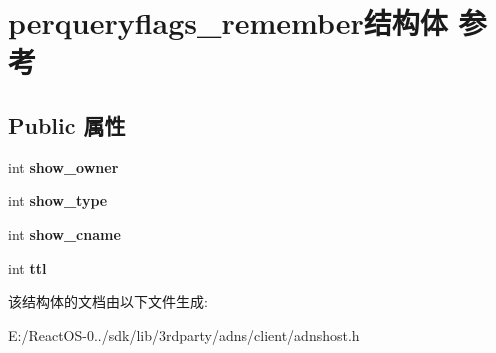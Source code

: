 \hypertarget{structperqueryflags__remember}{}\section{perqueryflags\+\_\+remember结构体 参考}
\label{structperqueryflags__remember}
\subsection*{Public 属性}
\begin{DoxyCompactItemize}
\item 
\mbox{\label{structperqueryflags__remember_aad76288c5ecd2806cd427838d8918b9a}} 
int {\bfseries show\+\_\+owner}
\item 
\mbox{\label{structperqueryflags__remember_a7e9c07044711bc79404fa77d251f2466}} 
int {\bfseries show\+\_\+type}
\item 
\mbox{\label{structperqueryflags__remember_a438635618eac98d7fe1fe7b052ea7afc}} 
int {\bfseries show\+\_\+cname}
\item 
\mbox{\label{structperqueryflags__remember_a433695a3dd6fd9e4d3029e66088086c0}} 
int {\bfseries ttl}
\end{DoxyCompactItemize}


该结构体的文档由以下文件生成\+:\begin{DoxyCompactItemize}
\item 
E\+:/\+React\+O\+S-\/0../sdk/lib/3rdparty/adns/client/adnshost.\+h\end{DoxyCompactItemize}
